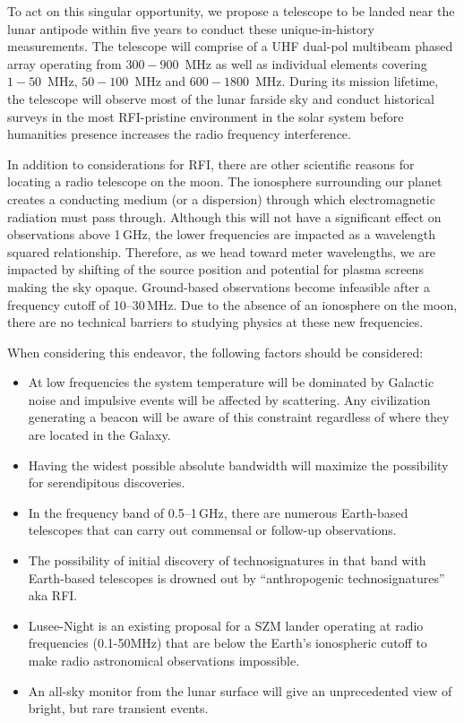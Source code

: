 To act on this singular opportunity, we propose a telescope to be landed near the lunar antipode within five years to conduct these unique-in-history measurements. The telescope will comprise of a UHF dual-pol multibeam phased array operating from $300-900$~MHz as well as individual elements covering $1-50$~MHz, $50-100$~MHz and $600-1800$~MHz. During its mission lifetime, the telescope will observe most of the lunar farside sky and conduct historical surveys in the most RFI-pristine environment in the solar system before humanities presence increases the radio frequency interference.

In addition to considerations for RFI, there are other scientific reasons for locating a radio telescope on the moon. The ionosphere surrounding our planet creates a conducting medium (or a dispersion) through which electromagnetic radiation must pass through. Although this will not have a significant effect on observations above 1\,GHz, the lower frequencies are impacted as a wavelength squared relationship. Therefore, as we head toward meter wavelengths, we are impacted by shifting of the source position and potential for plasma screens making the sky opaque. Ground-based observations become infeasible after a frequency cutoff of 10--30\,MHz. Due to the absence of an ionosphere on the moon, there are no technical barriers to studying physics at these new frequencies.

When considering this endeavor, the following factors should be considered:

\begin{itemize}

    \item At low frequencies the system temperature will be dominated by Galactic noise and impulsive events will be affected by scattering. Any civilization generating a beacon will be aware of this constraint regardless of where they are located in the Galaxy.

    \item Having the widest possible absolute bandwidth will maximize the possibility for serendipitous discoveries.

    \item In the frequency band of 0.5--1\,GHz, there are numerous Earth-based telescopes that can carry out commensal or follow-up observations.

    \item The possibility of initial discovery of technosignatures in that band with Earth-based telescopes is drowned out by ``anthropogenic technosignatures” aka RFI.

   \item Lusee-Night is an existing proposal for a SZM lander operating at radio frequencies (0.1-50MHz) that are below the Earth's ionospheric cutoff to make radio astronomical observations impossible. 

    \item An all-sky monitor from the lunar surface will give an unprecedented view of bright, but rare transient events.

\end{itemize}

